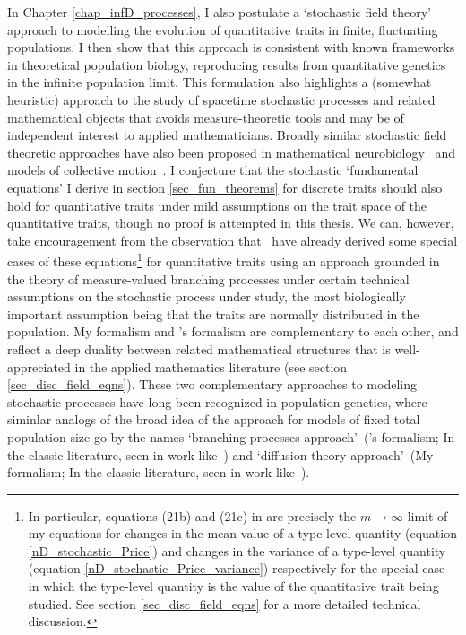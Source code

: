 In Chapter \ref{chap_infD_processes}, I also postulate a `stochastic field theory' approach to modelling the evolution of quantitative traits in finite, fluctuating populations. I then show that this approach is consistent with known frameworks in theoretical population biology, reproducing results from quantitative genetics in the infinite population limit. This formulation also highlights a (somewhat heuristic) approach to the study of spacetime stochastic processes and related mathematical objects that avoids measure-theoretic tools and may be of independent interest to applied mathematicians. Broadly similar stochastic field theoretic approaches have also been proposed in mathematical neurobiology~\citep{buice_field-theoretic_2007,bressloff_stochastic_2010,coombes_neural_2014} and models of collective motion~\citep{o_laighleis_minimal_2018}. I  conjecture that the stochastic `fundamental equations' I derive in section \ref{sec_fun_theorems} for discrete traits should also hold for quantitative traits under mild assumptions on the trait space of the quantitative traits, though no proof is attempted in this thesis. We can, however, take encouragement from the observation that~\cite{week_white_2021} have already derived some special cases of these equations\footnote{In particular, equations (21b) and (21c) in \cite{week_white_2021} are precisely the $m \to \infty$ limit of my equations for changes in the mean value of a type-level quantity (equation \ref{nD_stochastic_Price}) and changes in the variance of a type-level quantity (equation \ref{nD_stochastic_Price_variance}) respectively for the special case in which the type-level quantity is the value of the quantitative trait being studied. See section \ref{sec_disc_field_eqns} for a more detailed technical discussion.} for quantitative traits using an approach grounded in the theory of measure-valued branching processes under certain technical assumptions on the stochastic process under study, the most biologically important assumption being that the traits are normally distributed in the population. My formalism and \cite{week_white_2021}'s formalism are complementary to each other, and reflect a deep duality between related mathematical structures that is well-appreciated in the applied mathematics literature (see section \ref{sec_disc_field_eqns}). These two complementary approaches to modeling stochastic processes have long been recognized in population genetics, where siminlar analogs of the broad idea of the approach for models of fixed total population size go by the names `branching processes approach'~(\cite{week_white_2021}'s formalism; In the classic literature, seen in work like~\cite{haldane_mathematical_1927,fisher_distribution_1931}) and `diffusion theory approach'~(My formalism; In the classic literature, seen in work like~\cite{wright_evolution_1931,kimura_problems_1957}).
  
